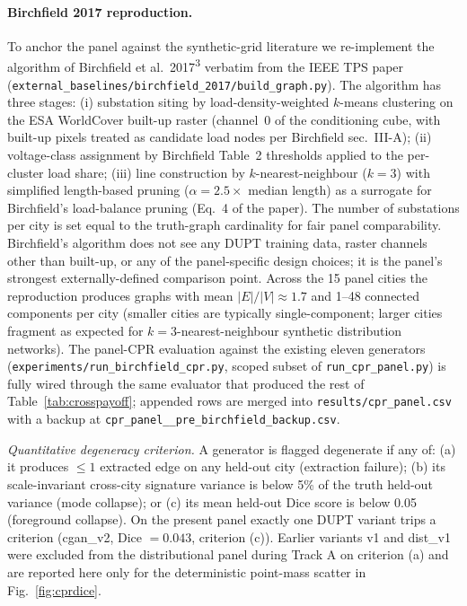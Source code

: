 \documentclass[10pt,a4paper]{article}
\begin{document}
\paragraph{Birchfield 2017 reproduction.} To anchor the panel
against the synthetic-grid literature we re-implement the
algorithm of Birchfield et al.\ 2017\textsuperscript{3} verbatim
from the IEEE TPS paper (\texttt{external\_baselines/birchfield\_2017/build\_graph.py}).
The algorithm has three stages: (i) substation siting by
load-density-weighted $k$-means clustering on the ESA WorldCover
built-up raster (channel~0 of the conditioning cube, with built-up
pixels treated as candidate load nodes per Birchfield sec.~III-A);
(ii) voltage-class assignment by Birchfield Table~2 thresholds
applied to the per-cluster load share; (iii) line construction by
$k$-nearest-neighbour ($k = 3$) with simplified length-based pruning
($\alpha = 2.5\times$ median length) as a surrogate for Birchfield's
load-balance pruning (Eq.~4 of the paper). The number of substations
per city is set equal to the truth-graph cardinality for fair panel
comparability. Birchfield's algorithm does not see any DUPT
training data, raster channels other than built-up, or any of the
panel-specific design choices; it is the panel's strongest
externally-defined comparison point. Across the 15 panel cities
the reproduction produces graphs with mean $|E|/|V| \approx 1.7$ and
1--48 connected components per city (smaller cities are typically
single-component; larger cities fragment as expected for
$k = 3$-nearest-neighbour synthetic distribution networks). The
panel-CPR evaluation against the existing eleven generators
(\texttt{experiments/run\_birchfield\_cpr.py}, scoped subset of
\texttt{run\_cpr\_panel.py}) is fully wired through the same
evaluator that produced the rest of Table~\ref{tab:crosspayoff};
appended rows are merged into \texttt{results/cpr\_panel.csv} with a
backup at \texttt{cpr\_panel\_\_pre\_birchfield\_backup.csv}.

\emph{Quantitative degeneracy criterion.} A generator is flagged
degenerate if any of: (a) it produces $\le 1$ extracted edge on
any held-out city (extraction failure); (b) its scale-invariant
cross-city signature variance is below 5\% of the truth held-out
variance (mode collapse); or (c) its mean held-out Dice score is
below 0.05 (foreground collapse). On the present panel
exactly one DUPT variant trips a criterion (cgan\_v2,
Dice $= 0.043$, criterion (c)). Earlier variants v1 and dist\_v1
were excluded from the distributional panel during Track A on
criterion (a) and are reported here only for the deterministic
point-mass scatter in Fig.~\ref{fig:cprdice}.
\end{document}
